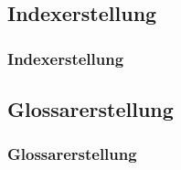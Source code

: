 \subsection{Indexerstellung}
\begin{frame}
  \frametitle{Indexerstellung}
  
\end{frame}

\subsection{Glossarerstellung}
\begin{frame}
  \frametitle{Glossarerstellung}
  
\end{frame}
